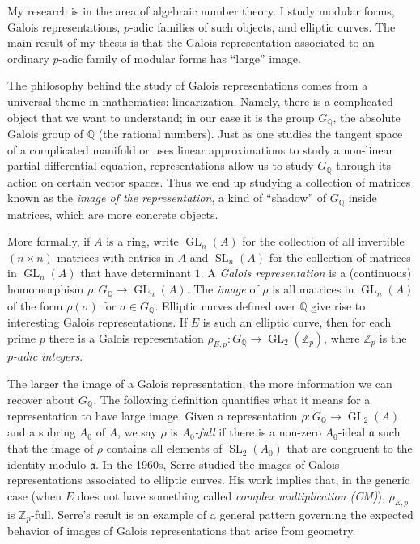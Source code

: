 \documentclass[12pt]{article}
\newcommand{\Aa}{\mathfrak{a}}
\newcommand{\Q}{\mathbb{Q}}
\newcommand{\Z}{\mathbb{Z}}
\DeclareMathOperator{\GL}{GL}
\DeclareMathOperator{\SL}{SL}
\begin{document}
My research is in the area of algebraic number theory.  I study modular forms, Galois representations, $p$-adic families of such objects, and elliptic curves.  The main result of my thesis is that the Galois representation associated to an ordinary $p$-adic family of modular forms has ``large'' image.  

The philosophy behind the study of Galois representations comes from a universal theme in mathematics: linearization. Namely, there is a complicated object that we want to understand; in our case it is the group $G_\Q$, the absolute Galois group of $\Q$ (the rational numbers).  Just as one studies the tangent space of a complicated manifold or uses linear approximations to study a non-linear partial differential equation, representations allow us to study $G_\Q$ through its action on certain vector spaces.  Thus we end up studying a collection of matrices known as the \textit{image of the representation}, a kind of ``shadow'' of $G_\Q$ inside matrices, which are more concrete objects.  

More formally, if $A$ is a ring, write $\GL_n(A)$ for the collection of all invertible $(n \times n)$-matrices with entries in $A$ and $\SL_n(A)$ for the collection of matrices in $\GL_n(A)$ that have determinant $1$.  A \textit{Galois representation} is a (continuous) homomorphism $\rho : G_\Q \to \GL_n(A)$.  The \textit{image} of $\rho$ is all matrices in $\GL_n(A)$ of the form $\rho(\sigma)$ for $\sigma \in G_\Q$.  Elliptic curves defined over $\Q$ give rise to interesting Galois representations.  If $E$ is such an elliptic curve, then for each prime $p$ there is a Galois representation $\rho_{E, p} : G_\Q \to \GL_2(\Z_p)$, where $\Z_p$ is the \textit{$p$-adic integers}.   

The larger the image of a Galois representation, the more information we can recover about $G_\Q$.  The following definition quantifies what it means for a representation to have large image.  Given a representation $\rho : G_\Q \to \GL_2(A)$ and a subring $A_0$ of $A$, we say $\rho$ is \textit{$A_0$-full} if there is a non-zero $A_0$-ideal $\Aa$ such that the image of $\rho$ contains all elements of $\SL_2(A_0)$ that are congruent to the identity modulo $\Aa$.  In the 1960s, Serre studied the images of Galois representations associated to elliptic curves.  His work implies that, in the generic case (when $E$ does not have something called  \textit{complex multiplication (CM)}), $\rho_{E, p}$ is $\Z_p$-full.  Serre's result is an example of a general pattern governing the expected behavior of images of Galois representations that arise from geometry.
\end{document}
